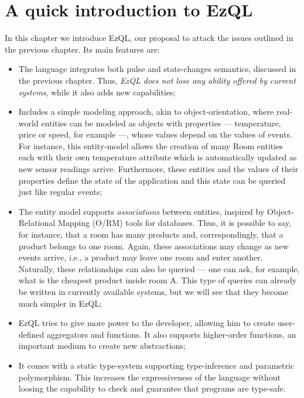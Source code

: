 \chapter{A quick introduction to EzQL}
\label{chap:ezql}

In this chapter we introduce EzQL, our proposal to attack the issues
outlined in the previous chapter. Its main features are:

\begin{itemize}
\item The language integrates both pulse and state-changes semantics,
  discussed in the previous chapter. Thus, \emph{EzQL does not lose
    any ability offered by current systems}, while it also adds new
  capabilities;
\item Includes a simple modeling approach, akin to object-orientation,
  where real-world entities can be modeled as objects with properties
  --- temperature, price or speed, for example ---, whose values
  depend on the values of events. For instance, this entity-model
  allows the creation of many Room entities each with their own
  temperature attribute which is automatically updated as new sensor
  readings arrive. Furthermore, these entities and the values of their
  properties define the state of the application and this state can be
  queried just like regular events;
\item The entity model supports \emph{associations} between entities,
  inspired by Ob\-ject-Relational Mapping (O/RM) tools for
  databases. Thus, it is possible to say, for instance, that a room
  has many products and, correspondingly, that a product belongs to
  one room. Again, these associations may change as new events arrive,
  i.e., a product may leave one room and enter another. Naturally,
  these relationships can also be queried --- one can ask, for
  example, what is the cheapest product inside room A. This type of
  queries can already be written in currently available systems, but
  we will see that they become much simpler in EzQL;
\item EzQL tries to give more power to the developer, allowing him to
  create user-defined aggregators and functions. It also supports
  higher-order functions, an important medium to create new
  abstractions;
\item It comes with a static type-system supporting type-inference and
  parametric polymorphism. This increases the expressiveness of the
  language without loosing the capability to check and guarantee that
  programs are type-safe.
\end{itemize}


